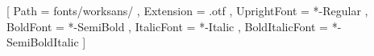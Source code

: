 \setsansfont{WorkSans}[
  Path = fonts/worksans/ ,
  Extension = .otf ,
  UprightFont = *-Regular ,
  BoldFont = *-SemiBold ,
  ItalicFont = *-Italic ,
  BoldItalicFont = *-SemiBoldItalic
]

\newcommand{\changelocaltocdepth}[1]{%
  \addtocontents{toc}{\protect\setcounter{tocdepth}{#1}}%
  \setcounter{tocdepth}{#1}%
}


\fancyhead{}
\renewcommand{\headrulewidth}{0pt}
\pagestyle{fancy}



